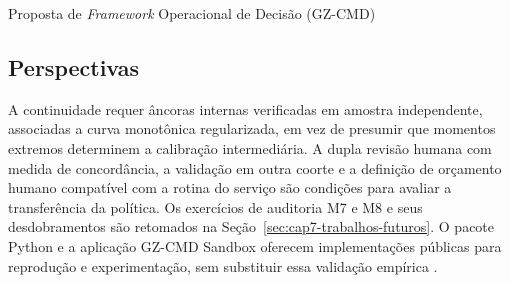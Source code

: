 \begin{chapter}{Proposta de \textit{Framework} Operacional de Decisão (GZ-CMD)}
\subsection{Perspectivas}
\label{sec:cap8-perspectivas}

A continuidade requer âncoras internas verificadas em amostra independente, associadas a curva monotônica regularizada, em vez de presumir que momentos extremos determinem a calibração intermediária. A dupla revisão humana com medida de concordância, a validação em outra coorte e a definição de orçamento humano compatível com a rotina do serviço são condições para avaliar a transferência da política. Os exercícios de auditoria M7 e M8 e seus desdobramentos são retomados na Seção~\ref{sec:cap7-trabalhos-futuros}. O pacote Python e a aplicação GZ-CMD Sandbox oferecem implementações públicas para reprodução e experimentação, sem substituir essa validação empírica \cite{Jardim2026gzcmd,Jardim2026gzcmdweb,Jardim2026phdrepo}.

\end{chapter}
